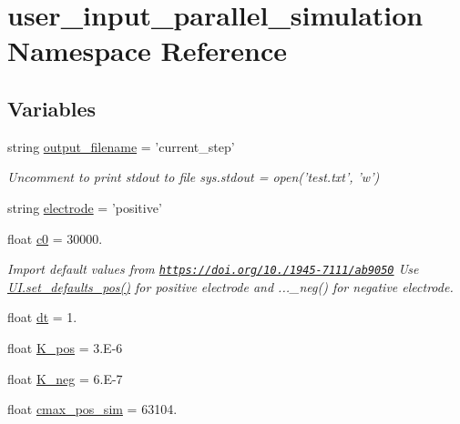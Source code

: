 \hypertarget{namespaceuser__input__parallel__simulation}{\section{user\-\_\-input\-\_\-parallel\-\_\-simulation Namespace Reference}
\label{namespaceuser__input__parallel__simulation}
}
\subsection*{Variables}
\begin{DoxyCompactItemize}
\item 
string \hyperlink{namespaceuser__input__parallel__simulation_ac0647ad8713153cc6b448750dbeb1b15}{output\-\_\-filename} = 'current\-\_\-step'
\begin{DoxyCompactList}\small\item\em Uncomment to print stdout to file sys.\-stdout = open('test.\-txt', 'w') \end{DoxyCompactList}\item 
string \hyperlink{namespaceuser__input__parallel__simulation_a6d9f4e281307eca8be6bad984ed9786d}{electrode} = 'positive'
\item 
float \hyperlink{namespaceuser__input__parallel__simulation_aa3407022b348cd058d9808eed482ab4a}{c0} = 30000.
\begin{DoxyCompactList}\small\item\em Import default values from \href{https://doi.org/10.1149/1945-7111/ab9050}{\tt https\-://doi.\-org/10./1945-\/7111/ab9050} Use \hyperlink{namespaceuser__input__mod_acef497295190e3914f7cd93da2708856}{U\-I.\-set\-\_\-defaults\-\_\-pos()} for positive electrode and ...\-\_\-neg() for negative electrode. \end{DoxyCompactList}\item 
float \hyperlink{namespaceuser__input__parallel__simulation_a778e38aa889751afffa2dea6b803e67a}{dt} = 1.
\item 
float \hyperlink{namespaceuser__input__parallel__simulation_ab1a8ebec490ba1301f818bd1c5f1f3fa}{K\-\_\-pos} = 3.\-E-\/6
\item 
float \hyperlink{namespaceuser__input__parallel__simulation_a64d0c5854299798787675bc91586023c}{K\-\_\-neg} = 6.\-E-\/7
\item 
float \hyperlink{namespaceuser__input__parallel__simulation_aa5b015cc7d0bda453c6163023448db72}{cmax\-\_\-pos\-\_\-sim} = 63104.

\end{DoxyCompactItemize}
